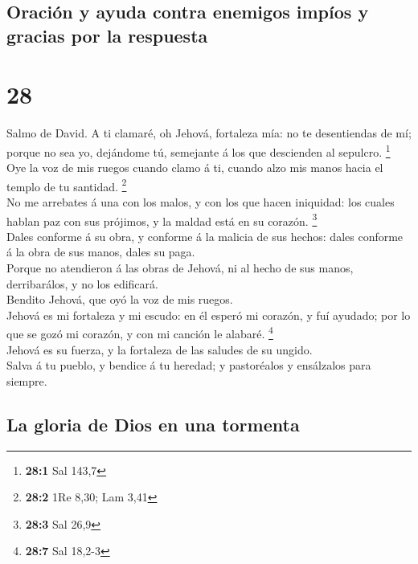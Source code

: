 \hypertarget{oraciuxf3n-y-ayuda-contra-enemigos-impuxedos-y-gracias-por-la-respuesta}{%
\subsection{Oración y ayuda contra enemigos impíos y gracias por la
respuesta}\label{oraciuxf3n-y-ayuda-contra-enemigos-impuxedos-y-gracias-por-la-respuesta}}

\hypertarget{section-27}{%
\section{28}\label{section-27}}

 Salmo de David. A ti clamaré, oh Jehová, fortaleza mía:
no te desentiendas de mí; porque no sea yo, dejándome tú, semejante á
los que descienden al sepulcro. \footnote{\textbf{28:1} Sal 143,7}\\
 Oye la voz de mis ruegos cuando clamo á ti, cuando alzo
mis manos hacia el templo de tu santidad. \footnote{\textbf{28:2} 1Re
  8,30; Lam 3,41}\\
 No me arrebates á una con los malos, y con los que hacen
iniquidad: los cuales hablan paz con sus prójimos, y la maldad está en
su corazón. \footnote{\textbf{28:3} Sal 26,9}\\
 Dales conforme á su obra, y conforme á la malicia de sus
hechos: dales conforme á la obra de sus manos, dales su paga.\\
 Porque no atendieron á las obras de Jehová, ni al hecho
de sus manos, derribarálos, y no los edificará.\\
 Bendito Jehová, que oyó la voz de mis ruegos.\\
 Jehová es mi fortaleza y mi escudo: en él esperó mi
corazón, y fuí ayudado; por lo que se gozó mi corazón, y con mi canción
le alabaré. \footnote{\textbf{28:7} Sal 18,2-3}\\
 Jehová es su fuerza, y la fortaleza de las saludes de su
ungido.\\
 Salva á tu pueblo, y bendice á tu heredad; y pastoréalos
y ensálzalos para siempre.

\hypertarget{la-gloria-de-dios-en-una-tormenta}{%
\subsection{La gloria de Dios en una
tormenta}\label{la-gloria-de-dios-en-una-tormenta}}

